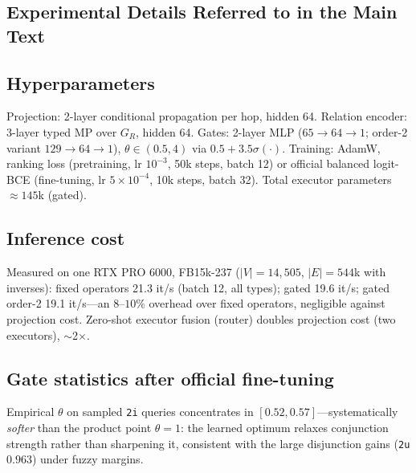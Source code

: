 \documentclass[journal]{IEEEtran}
\begin{document}
\subsection*{Experimental Details Referred to in the Main Text}

\subsection{Hyperparameters}
Projection: 2-layer conditional propagation per hop, hidden 64.
Relation encoder: 3-layer typed MP over $G_R$, hidden 64. Gates: 2-layer
MLP ($65\!\to\!64\!\to\!1$; order-2 variant $129\!\to\!64\!\to\!1$),
$\theta\in(0.5,4)$ via $0.5+3.5\sigma(\cdot)$. Training: AdamW, ranking
loss (pretraining, lr $10^{-3}$, 50k steps, batch 12) or official
balanced logit-BCE (fine-tuning, lr $5\times10^{-4}$, 10k steps, batch
32). Total executor parameters $\approx 145$k (gated).

\subsection{Inference cost}
Measured on one RTX PRO 6000, FB15k-237 ($|V|{=}14{,}505$, $|E|{=}544$k
with inverses): fixed operators 21.3 it/s (batch 12, all types);
gated 19.6 it/s; gated order-2 19.1 it/s---an $8$--$10\%$ overhead over
fixed operators, negligible against projection cost. Zero-shot executor
fusion (router) doubles projection cost (two executors), $\sim$2$\times$.

\subsection{Gate statistics after official fine-tuning}
Empirical $\theta$ on sampled \texttt{2i} queries concentrates in
$[0.52,0.57]$---systematically \emph{softer} than the product point
$\theta=1$: the learned optimum relaxes conjunction strength rather than
sharpening it, consistent with the large disjunction gains
(\texttt{2u} $0.963$) under fuzzy margins.



\end{document}
